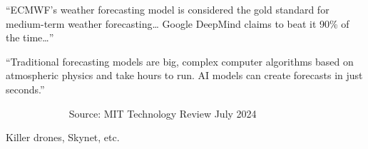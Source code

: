 \begin{frame}

    
    ``ECMWF's weather forecasting model is considered the gold standard for
        medium-term weather forecasting\ldots 
        Google DeepMind claims to beat it 90\% of the time\ldots''

    \vspace{0.5em}
    \vspace{0.5em}

    ``Traditional forecasting models are big, complex computer algorithms based
    on atmospheric physics and take hours to run. AI models can create forecasts
    in just seconds.'' 
    \vspace{0.5em}
    \vspace{0.5em}

    $\quad \qquad$$\quad \qquad$ Source: MIT Technology Review  July 2024



\end{frame}



\begin{frame}{Killer drones, Skynet, etc.}

    \begin{figure}
       \centering
    \end{figure}

\end{frame}

